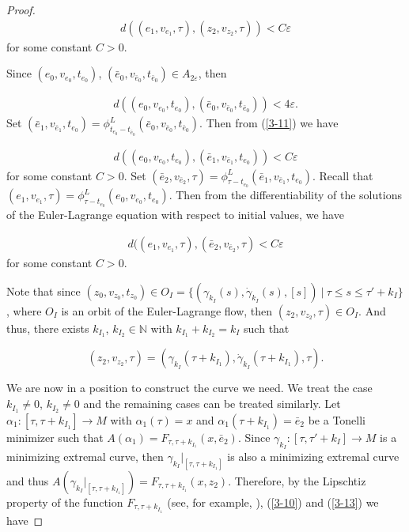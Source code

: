 \documentclass{amsart}[12pt]
\theoremstyle{definition}
\theoremstyle{remark}
\numberwithin{equation}{section}
\begin{document}
\begin{proof}
\begin{align}\label{3-10}
d((e_1,v_{e_1},\tau),(z_2,v_{z_2},\tau))<C\varepsilon
\end{align}
for some constant $C>0$.

Since $(e_0,v_{e_0},t_{e_0})$,
$(\bar{e}_0,v_{\bar{e}_0},t_{\bar{e}_0})\in A_{2\varepsilon}$,
then

\begin{align}\label{3-11}
d((e_0,v_{e_0},t_{e_0}),
(\bar{e}_0,v_{\bar{e}_0},t_{\bar{e}_0}))<4\varepsilon.
\end{align}
Set
$(\bar{e}_1,v_{\bar{e}_1},t_{e_0})=\phi^L_{t_{e_0}-t_{\bar{e}_0}}(\bar{e}_0,v_{\bar{e}_0},t_{\bar{e}_0})$.
Then from (\ref{3-11}) we have

\begin{align}\label{3-12}
d((e_0,v_{e_0},t_{e_0}),
(\bar{e}_1,v_{\bar{e}_1},t_{e_0}))<C\varepsilon
\end{align}
for some constant $C>0$. Set
$(\bar{e}_2,v_{\bar{e}_2},\tau)=\phi^L_{\tau-t_{e_0}}(\bar{e}_1,v_{\bar{e}_1},t_{e_0})$.
Recall that
$(e_1,v_{e_1},\tau)=\phi^L_{\tau-t_{e_0}}(e_0,v_{e_0},t_{e_0})$.
Then from the differentiability of the solutions of the
Euler-Lagrange equation with respect to initial values, we have

\begin{align}\label{3-13}
d((e_1,v_{e_1},\tau),(\bar{e}_2,v_{\bar{e}_2},\tau)<C\varepsilon
\end{align}
for some constant $C>0$.

Note that since $(z_0,v_{z_0},t_{z_0})\in
O_I=\{(\gamma_{k_I}(s),\dot{\gamma}_{k_I}(s),[s])\ |\ \tau\leq
s\leq\tau'+k_I\}$, where $O_I$ is an orbit of the Euler-Lagrange
flow, then $(z_2,v_{z_2},\tau)\in O_I$. And thus, there exists
$k_{I_1}$, $k_{I_2}\in\mathbb{N}$ with $k_{I_1}+k_{I_2}=k_I$ such
that

\[
(z_2,v_{z_2},\tau)=(\gamma_{k_I}(\tau+k_{I_1}),\dot{\gamma}_{k_I}(\tau+k_{I_1}),\tau).
\]

We are now in a position to construct the curve we need. We treat
the case $k_{I_1}\neq 0$, $k_{I_2}\neq 0$ and the remaining cases
can be treated similarly. Let $\alpha_1:[\tau,\tau+k_{I_1}]\to M$
with $\alpha_1(\tau)=x$ and $\alpha_1(\tau+k_{I_1})=\bar{e}_2$ be
a Tonelli minimizer such that
$A(\alpha_1)=F_{\tau,\tau+k_{I_1}}(x,\bar{e}_2)$. Since
$\gamma_{k_I}:[\tau,\tau'+k_I]\to M$ is a minimizing extremal
curve, then $\gamma_{k_I}|_{[\tau,\tau+k_{I_1}]}$ is also a
minimizing extremal curve and thus
$A(\gamma_{k_I}|_{[\tau,\tau+k_{I_1}]})=F_{\tau,\tau+k_{I_1}}(x,z_2)$.
Therefore, by the Lipschtiz property of the function
$F_{\tau,\tau+k_{I_1}}$ (see, for example, \cite{Ber}),
(\ref{3-10}) and (\ref{3-13}) we have


\end{proof}
\end{document}

